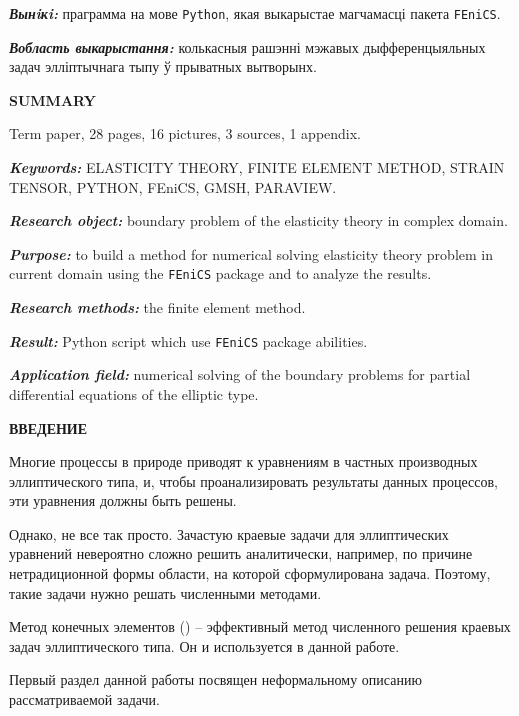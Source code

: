 \documentclass[a4paper, 14pt]{extreport}
\begin{document}
\textbf{\textit{Вынiкi:}} праграмма на мове \texttt{Python},
якая выкарыстае магчамасці пакета \texttt{FEniCS}.

\textbf{\textit{Вобласть выкарыстання:}} колькасныя рашэнні мэжавых 
дыфференцыяльных задач элліптычнага тыпу ў прыватных вытворынх.


\begin{center}
	\Large{\textbf{SUMMARY}}
\end{center}

Term paper, 28 pages, 16 pictures, 3 sources, 1 appendix.

\textbf{\textit{Keywords:}} ELASTICITY THEORY, FINITE ELEMENT METHOD,
STRAIN TENSOR, PYTHON, FEniCS, GMSH, 
PARAVIEW.

\textbf{\textit{Research object:}} boundary problem of the elasticity
theory in complex domain.

\textbf{\textit{Purpose:}} to build a method for numerical solving 
elasticity theory problem in current domain using the \texttt{FEniCS}
package and to analyze the results.

\textbf{\textit{Research methods:}} the finite element method.

\textbf{\textit{Result:}} Python script which use \texttt{FEniCS}
package abilities.

\textbf{\textit{Application field:}} numerical solving of the
boundary problems for partial differential equations of the elliptic type.


\newpage
{}
\begin{center}
	\Large{\textbf{ВВЕДЕНИЕ}}
\end{center}

Многие процессы в природе приводят к уравнениям в частных производных
эллиптического типа, и, чтобы проанализировать результаты данных процессов,
эти уравнения должны быть решены.

Однако, не все так просто. Зачастую краевые задачи для эллиптических
уравнений невероятно сложно решить аналитически, например, по причине
нетрадиционной формы области, на которой сформулирована задача.
Поэтому, такие задачи нужно решать численными методами.

Метод конечных элементов (\cite{finite_element_method}) -- эффективный метод численного решения краевых задач
эллиптического типа. Он и используется в данной работе.

Первый раздел данной работы посвящен неформальному описанию рассматриваемой
задачи.
\end{document}
